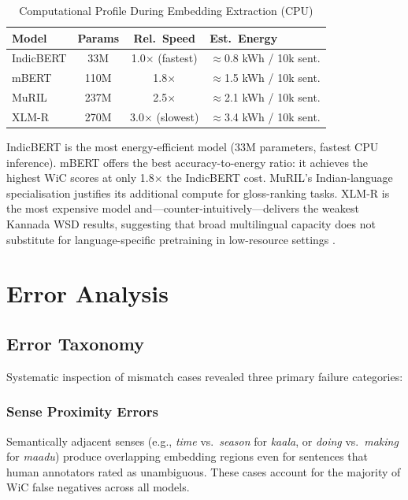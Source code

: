 \documentclass{ieeeaccess}
\begin{document}
\begin{table}[t!]
\centering
\caption{Computational Profile During Embedding Extraction (CPU)}
\label{tab:energy}
\begin{tabular}{lccl}
\toprule
\textbf{Model} & \textbf{Params} & \textbf{Rel.\ Speed} & \textbf{Est.\ Energy}\\
\midrule
IndicBERT & 33M  & 1.0$\times$ (fastest) & $\approx$0.8 kWh / 10k sent.\\
mBERT     & 110M & 1.8$\times$           & $\approx$1.5 kWh / 10k sent.\\
MuRIL     & 237M & 2.5$\times$           & $\approx$2.1 kWh / 10k sent.\\
XLM-R     & 270M & 3.0$\times$ (slowest) & $\approx$3.4 kWh / 10k sent.\\
\bottomrule
\end{tabular}
\end{table}

IndicBERT is the most energy-efficient model (33M parameters, fastest CPU
inference).
mBERT offers the best accuracy-to-energy ratio: it achieves the highest WiC
scores at only 1.8$\times$ the IndicBERT cost.
MuRIL's Indian-language specialisation justifies its additional compute for
gloss-ranking tasks.
XLM-R is the most expensive model and---counter-intuitively---delivers the
weakest Kannada WSD results, suggesting that broad multilingual capacity does
not substitute for language-specific pretraining in low-resource settings
\cite{strubell2019,schwartz2020}.

\section{Error Analysis}
\label{sec:error}

\subsection{Error Taxonomy}

Systematic inspection of mismatch cases revealed three primary failure
categories:

\subsubsection{Sense Proximity Errors}
Semantically adjacent senses (e.g., \textit{time} vs.\ \textit{season} for
\textit{kaala}, or \textit{doing} vs.\ \textit{making} for \textit{maadu})
produce overlapping embedding regions even for sentences that human annotators
rated as unambiguous.
These cases account for the majority of WiC false negatives across all models.
\end{document}
